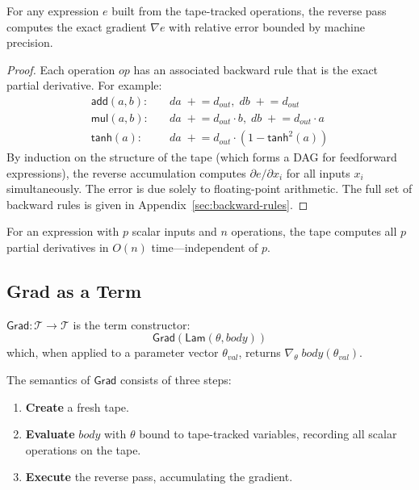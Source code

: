 \documentclass{lmcs}
\theoremstyle{plain}
\theoremstyle{definition}
\newcommand{\Tcal}{\mathcal{T}}
\begin{document}
\begin{thm}\label{thm:tape-correct}
For any expression $e$ built from the tape-tracked operations, the reverse
pass computes the exact gradient $\nabla e$ with relative error bounded by
machine precision.
\end{thm}

\begin{proof}
Each operation $\mathit{op}$ has an associated backward rule that is the
exact partial derivative. For example:
\begin{align*}
\mathsf{add}(a, b):&\quad da \;+\!\!= d_{\mathit{out}},\;
  db \;+\!\!= d_{\mathit{out}} \\
\mathsf{mul}(a, b):&\quad da \;+\!\!= d_{\mathit{out}} \cdot b,\;
  db \;+\!\!= d_{\mathit{out}} \cdot a \\
\mathsf{tanh}(a):&\quad da \;+\!\!= d_{\mathit{out}} \cdot (1 -
  \mathsf{tanh}^2(a))
\end{align*}
By induction on the structure of the tape (which forms a DAG for
feedforward expressions), the reverse accumulation computes
$\partial e / \partial x_i$ for all inputs $x_i$ simultaneously. The error
is due solely to floating-point arithmetic. The full set of backward rules
is given in Appendix~\ref{sec:backward-rules}.
\end{proof}

\begin{cor}[Complexity]\label{cor:tape-complexity}
For an expression with $p$ scalar inputs and $n$ operations, the tape
computes all $p$ partial derivatives in $O(n)$ time---independent of $p$.
\end{cor}

\subsection{Grad as a Term}

\begin{defi}
$\mathsf{Grad} : \Tcal \to \Tcal$ is the term constructor:
\[
\mathsf{Grad}(\mathsf{Lam}(\theta, body))
\]
which, when applied to a parameter vector $\theta_{\mathit{val}}$, returns
$\nabla_\theta\; body(\theta_{\mathit{val}})$.
\end{defi}

The semantics of $\mathsf{Grad}$ consists of three steps:
\begin{enumerate}
\item \textbf{Create} a fresh tape.
\item \textbf{Evaluate} $\mathit{body}$ with $\theta$ bound to tape-tracked
  variables, recording all scalar operations on the tape.
\item \textbf{Execute} the reverse pass, accumulating the gradient.
\end{enumerate}
\end{document}
